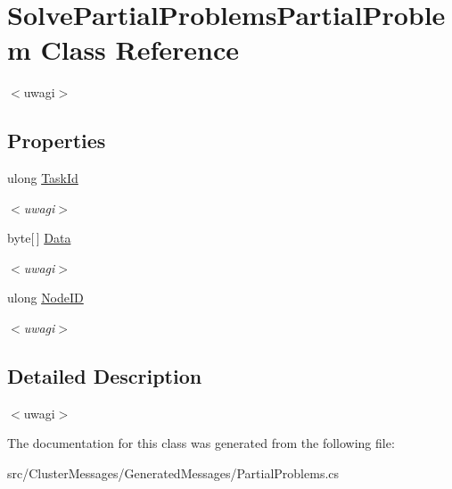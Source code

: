 \hypertarget{class_solve_partial_problems_partial_problem}{}\section{Solve\+Partial\+Problems\+Partial\+Problem Class Reference}
\label{class_solve_partial_problems_partial_problem}


$<$uwagi$>$  


\subsection*{Properties}
\begin{DoxyCompactItemize}
\item 
\hypertarget{class_solve_partial_problems_partial_problem_ada4c288b3516ef8ec6ad968fecab7962}{}ulong \hyperlink{class_solve_partial_problems_partial_problem_ada4c288b3516ef8ec6ad968fecab7962}{Task\+Id}\label{class_solve_partial_problems_partial_problem_ada4c288b3516ef8ec6ad968fecab7962}

\begin{DoxyCompactList}\small\item\em $<$uwagi$>$ \end{DoxyCompactList}\item 
\hypertarget{class_solve_partial_problems_partial_problem_ae2b5d38baf6e3b4e36a89a8617a6abfb}{}byte\mbox{[}$\,$\mbox{]} \hyperlink{class_solve_partial_problems_partial_problem_ae2b5d38baf6e3b4e36a89a8617a6abfb}{Data}\label{class_solve_partial_problems_partial_problem_ae2b5d38baf6e3b4e36a89a8617a6abfb}

\begin{DoxyCompactList}\small\item\em $<$uwagi$>$ \end{DoxyCompactList}\item 
\hypertarget{class_solve_partial_problems_partial_problem_a1a85cea91042baaf387a8372a955cb28}{}ulong \hyperlink{class_solve_partial_problems_partial_problem_a1a85cea91042baaf387a8372a955cb28}{Node\+I\+D}\label{class_solve_partial_problems_partial_problem_a1a85cea91042baaf387a8372a955cb28}

\begin{DoxyCompactList}\small\item\em $<$uwagi$>$ \end{DoxyCompactList}\end{DoxyCompactItemize}


\subsection{Detailed Description}
$<$uwagi$>$ 

The documentation for this class was generated from the following file\+:\begin{DoxyCompactItemize}
\item 
src/\+Cluster\+Messages/\+Generated\+Messages/Partial\+Problems.\+cs\end{DoxyCompactItemize}
